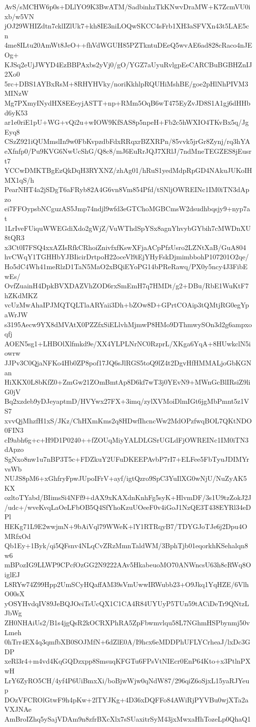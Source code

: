 AvS/sMCHW6p0s+DLlYO9K3BwATM/SadbinhzTkKNwvDraMW+K7ZcmVU0ixb/w5VN
jOJ29WHIZdtn7cklIZlUk7+kh8IE3niLOQwSKCC4sFrb1XH3aSFVXn43t5LAE5cn
4me8ILtu20AmWt8JeO++fhVdWGUH85PZTkntuDEeQ5wvAE6ad828cRaco4nJEOg+
KJSq2eUjJWYD4EzBBPAxbs2yVj0/gO/YGZ7aUyuRvlgpEeCARCBuBGBHZnIJ2Xo0
5rc+DBS1AYBxRsM+8RHYHVky/noriKkhlpRQUHiMshBE/goe2pHlNhPIVM3MINzW
Mg7PXmyINydHX8EEeyjASTT+np+RMm5OqB6wT475EyZvJD8S1A1gj6dHHbd6yK53
ar1e0riE1pU+WG+vQi2u+wIOW9KfSAS8p5npeH+Fb2c5hWXIO4TKvBx5q/JgEyq8
CSzZ921iQUMmslIn9w0FbKvpzdbFdxRRqxrBZXRPn/85vvk5jrGr8Zynj/rq3hYA
eXfnfp0/Pu9KVG6NwUcShG/Q8c8/mJ6EuRrJQJ7XRlJ/7ndMneTEGZES8jEusrt7
YCCwDMKTBgEzQkDqH3RYXNZ/zhAg01/hRuS1yedMdpRpGD4NAkuJUKoIHMX1qS/h
PearNHT4a2jSDgT6aFRyb82A4G6vn8Vm854Pfd/tSNljOWREINc1IM0iTN3dApzo
ei7FFOypsbNCguzAS5Jmp74ndjl9wfd3eGTChoMGBCmsW2dsudhbqsjy9+nyp7at
1LrIveFUiquWWEGdiXdo2gWjZ/VuWThdSpYSx8agnYhvybGYbih7cMWDnXU8tQR3
x3Ct0I7FSQ4xxAZIsRfkCRhoiZnivfxfKswXFjaACpPfzUsro2LZNtXaB/GuA804
hvCWqY1TGHHbYJBIicirDrtpoH22oceVl9iEjYHyFskDjmimbbohP107201O2qe/
Ho5dC4Wh41meRlzD1TaN5MaO2xBQiEYoPG14bPReRawq/PX0y5ncy4J3FibEwEs/
OvfZuainH4DpkBVXDAZVhZOD6rxSmEmH7q7HMDt/g2+DBu/RbE1WuKtF7hZKdMKZ
vcUzMwAhaIPJMQTQLTlaARYaii3Dh+bZOw8D+GPrtCOAip3tQMtjRG0egYpaWrJW
s3195Aecw9YX8dMVAtX0PZZfxSiELlvhMjmwP8HMo9DThmwySOn3d2g6ampxoqfj
AOEN5sg1+LHBOlXlfmkd9e/XX4YLPLNrNC0RzprL/XKga6YqA+8HUwkclN5iowrw
JJPv3C0QjaNFKo4Hb0ZP8pof17JQ6sJlRGS5toQ9lZ4t2DgvHfHMMALjoGbKGNan
HiXKX0L8bKfZ0+ZmGw21ZOmBmtAp8D6kf7wT3j0YEvN9+MWnGcBlIRsiZ9liG0jV
Bq2xzdeb9yDJeyaptmD/HVYwx27FX+3imq/zylXVMoiDlmIGt6jgMbPmnt5z1VS7
xvvQjMhzfH1xS/JKz/ChHXmKms2q8HDwfIhcncWw2MdOPzfwqBOL7QKtNDO0FIN3
cI9abh6g+c+H9D1P0240++fZOUqMiyYALDLGSrUGLdFjOWREINc1IM0iTN3dApzo
SgNxo8nw1u7nBP3T5c+FDZkuY2UFuDKEEPAvbP7rI7+ELFee5FbTyuJDIMYrvsWb
NUJS8pM6+xGhfryFpwJUpoIFrV+ayf/igtQzro9SpC3YuIlXG0wNjU/NuZyAK5KX
ozltoTYabd/BIimsSi4NFf9+dAX9xKAXdnKnhFg5syK+HlvmDF/3s1U9tzZokJ2J
/udc+/wveKvqLaOeLFbOB5Q4SfYhoKzuUOeeF0v4iGoJ1NzQE3T438EYRl34eDPl
HEKg71L9E2wwjmN+9bAiVql79WWeK+lY1RTRqyB7/TDYGJoTJe6j2Dpu4OMRfxOd
Qb1Ey+1Byk/qi5QFsnv4NLqCvZRzMmnTaldWM/3BphTjb01eqorkhKSehalqn8w6
mBPozIG9LLWP9CPcfOzGG2N9222AAv5HkabeuoMO70ANWncsU63h8cRWq8OiglEJ
L8RYw74Z99Hpp2UmSCyHQaffAM39sVmUwwIRWubb23+O9Jkq1YqHZE/6VlhO00sX
yOSYHvdqIV89JeBQJOeiTsUcQX1C1CA4R84UYUyP5TUn59tACiDeTr9QNtzLJbWg
ZH0NHAiUs2/B1s4jgQsR2kOCRXPhRA5ZpFbwmvlqu58L7NGhmHSPbynmj50vLmeh
0hTrr4EX4q3qmfbXB0SOJMfN+6dZlE0A/I9hcx6eMDDPhUFLYCrheaJ/lxDc3GDP
xeRl3r4+m4vd4KqGQDzxpp8SmsuqKFGTu6FPsVtNIEcr0EnP64Kto+x3PtlnPXwH
LrY6ZyRO5CH/4yf4P6UiBmxXi/boBjwWjw0qNdW87/296qiZ6oSjxL15yaRJYeup
DOzVFCROlGtwF9h4pKw+2lTYJKg+4D36xDQFFo84AWiRjPYVBu0wjXTa2aVXJNAe
AmBroIZhq5ySajVDAm9n8zfrBXcXlx7sSUaxitrSyM43jxMwxaHhTozeLp0QhaQ1
